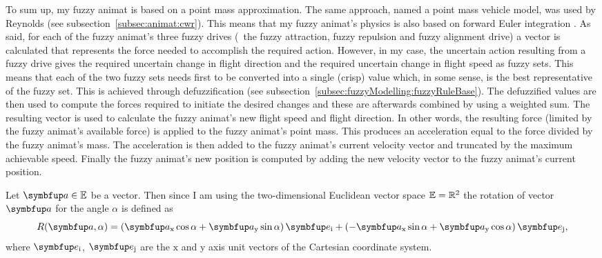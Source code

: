To sum up, my fuzzy animat is based on a point mass approximation. The same approach, named a point mass vehicle model, was used by Reynolds \cite{reynolds:1987,reynolds:1999} (see subsection~\ref{subsec:animat:cwr}). This means that my fuzzy animat's physics is also based on forward Euler integration \cite{parent:2002,reynolds:1999}. As said, for each of the fuzzy animat's three fuzzy drives (\ie\ the fuzzy attraction, fuzzy repulsion and fuzzy alignment drive) a vector is calculated that represents the force needed to accomplish the required action. However, in my case, the uncertain action resulting from a fuzzy drive gives the required uncertain change in flight direction and the required uncertain change in flight speed as fuzzy sets. This means that each of the two fuzzy sets needs first to be converted into a single (crisp) value which, in some sense, is the best representative of the fuzzy set. This is achieved through defuzzification (see subsection~\ref{subsec:fuzzyModelling:fuzzyRuleBase}). The defuzzified values are then used to compute the forces required to initiate the desired changes and these are afterwards combined by using a weighted sum.  The resulting vector is used to calculate the fuzzy animat's new flight speed and flight direction. In other words, the resulting force (limited by the fuzzy animat's available force) is applied to the fuzzy animat's point mass. This produces an acceleration equal to the force divided by the fuzzy animat's mass. The acceleration is then added to the fuzzy animat's current velocity vector and truncated by the maximum achievable speed. Finally the fuzzy animat's new position is computed by adding the new velocity vector to the fuzzy animat's current position. 

Let $\vect{a} \in \E$ be a vector. Then since I am using the two-dimensional Euclidean vector space $\mathbb{E}=\mathbb{R}^2$ the rotation of vector $\vect{a}$ for the angle $\alpha$ is defined as
%
\begin{equation}
	R(\vect{a}, \alpha) = \left(\vect{a}_\textnormal{x}\cos\alpha + \vect{a}_\textnormal{y}\sin\alpha\right)\vect{e}_\textnormal{i} + \left(-\vect{a}_\textnormal{x}\sin\alpha + \vect{a}_\textnormal{y}\cos\alpha\right)\vect{e}_\textnormal{j},
\end{equation}
%
where $\vect{e}_\textnormal{i}$, $\vect{e}_\textnormal{j}$ are the $\mathrm{x}$ and $\mathrm{y}$ axis unit vectors of the Cartesian coordinate system.

